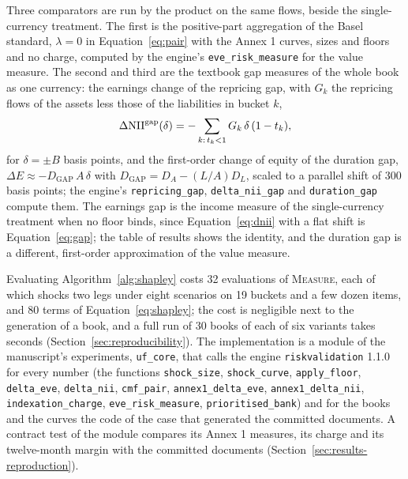 Three comparators are run by the product on the same flows, beside the single-currency treatment. The first is the positive-part aggregation of the Basel standard, $\lambda=0$ in Equation~\eqref{eq:pair} with the Annex 1 curves, sizes and floors and no charge, computed by the engine's \texttt{eve\_risk\_measure} for the value measure. The second and third are the textbook gap measures of the whole book as one currency: the earnings change of the repricing gap, with $G_k$ the repricing flows of the assets less those of the liabilities in bucket $k$,
\begin{equation}
\Delta\mathrm{NII}^{\mathrm{gap}}(\delta)=-\sum_{k:\,t_k<1}G_k\,\delta\,(1-t_k),
\label{eq:gap}
\end{equation}
for $\delta=\pm B$ basis points, and the first-order change of equity of the duration gap, $\Delta E\approx-D_{\mathrm{GAP}}\,A\,\delta$ with $D_{\mathrm{GAP}}=D_A-(L/A)D_L$, scaled to a parallel shift of 300 basis points; the engine's \texttt{repricing\_gap}, \texttt{delta\_nii\_gap} and \texttt{duration\_gap} compute them. The earnings gap is the income measure of the single-currency treatment when no floor binds, since Equation~\eqref{eq:dnii} with a flat shift is Equation~\eqref{eq:gap}; the table of results shows the identity, and the duration gap is a different, first-order approximation of the value measure.

Evaluating Algorithm~\ref{alg:shapley} costs 32 evaluations of \textsc{Measure}, each of which shocks two legs under eight scenarios on 19 buckets and a few dozen items, and 80 terms of Equation~\eqref{eq:shapley}; the cost is negligible next to the generation of a book, and a full run of 30 books of each of six variants takes seconds (Section~\ref{sec:reproducibility}). The implementation is a module of the manuscript's experiments, \texttt{uf\_core}, that calls the engine \texttt{riskvalidation} 1.1.0 for every number (the functions \texttt{shock\_size}, \texttt{shock\_curve}, \texttt{apply\_floor}, \texttt{delta\_eve}, \texttt{delta\_nii}, \texttt{cmf\_pair}, \texttt{annex1\_delta\_eve}, \texttt{annex1\_delta\_nii}, \texttt{indexation\_charge}, \texttt{eve\_risk\_measure}, \texttt{prioritised\_bank}) and for the books and the curves the code of the case that generated the committed documents. A contract test of the module compares its Annex 1 measures, its charge and its twelve-month margin with the committed documents (Section~\ref{sec:results-reproduction}).
